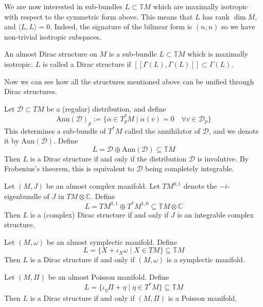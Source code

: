 We are now interested in sub-bundles $L\subset\mathbb{T}M$ which are maximally isotropic with respect to the symmetric form above. This means that $L$ has rank $\dim M$, and $\langle L,L\rangle=0$. Indeed, the signature of the bilinear form is $(n,n)$ so we have non-trivial isotropic subspaces.
\begin{definition}
  An almost Dirac structure on $M$ is a sub-bundle $L\subset\mathbb{T}M$ which is maximally isotropic. $L$ is called a Dirac structure if $[\![\Gamma(L),\Gamma(L)]\!]\subset\Gamma(L)$.
\end{definition}
Now we can see how all the structures mentioned above can be unified through Dirac structures.
\begin{example}[Distributions]
  Let $\mathcal{D}\subset TM$ be a (regular) distribution, and define $$\text{Ann}(\mathcal{D})_p:=\{\alpha\in T_p^*M\mid \alpha(v)=0\quad\forall v\in \mathcal{D}_p\}$$
  This determines a sub-bundle of $T^*M$ called the annihilator of $\mathcal{D}$, and we denote it by $\text{Ann}(\mathcal{D})$. Define
  \begin{equation}
      L=\mathcal{D}\oplus\text{Ann}(\mathcal{D})\subseteq\mathbb{T}M
  \end{equation}
  Then $L$ is a Dirac structure if and only if the distribution $\mathcal{D}$ is involutive. By Frobenius's theorem, this is equivalent to $\mathcal{D}$ being completely integrable.
\end{example}
\begin{example}
    Let $(M, J)$ be an almost complex manifold. Let $TM^{0,1}$ denote the $-i$-eigenbundle of $J$ in $TM\otimes\mathbb{C}$. Define
    \begin{equation}
        L=TM^{0,1}\oplus T^*M^{1,0}\subseteq \mathbb{T}M\otimes\mathbb{C}
    \end{equation}
    Then $L$ is a (complex) Dirac structure if and only if $J$ is an integrable complex structure.
\end{example}
\begin{example}
    Let $(M,\omega)$ be an almost symplectic manifold. Define
    \begin{equation}
        L=\{X+\iota_X\omega\mid X\in TM\}\subseteq \mathbb{T}M
    \end{equation}
    Then $L$ is a Dirac structure if and only if $(M,\omega)$ is a symplectic manifold.
\end{example}
\begin{example}
    Let $(M,\Pi)$ be an almost Poisson manifold. Define
    \begin{equation}
        L=\{\iota_\eta \Pi +\eta\mid\eta\in T^*M\}\subseteq \mathbb{T}M
    \end{equation}
    Then $L$ is a Dirac structure if and only if $(M,\Pi)$ is a Poisson manifold.
\end{example}

